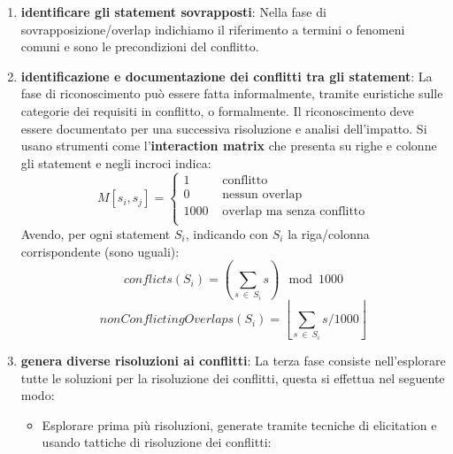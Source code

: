 \begin{enumerate}
      \item \textbf{identificare gli statement sovrapposti}:
            Nella fase di sovrapposizione/overlap indichiamo il riferimento a
            termini o fenomeni comuni e sono le precondizioni del conflitto.
      \item \textbf{identificazione e documentazione dei conflitti tra gli statement}:
            La fase di riconoscimento può essere fatta informalmente, tramite
            euristiche sulle categorie dei requisiti in conflitto, o formalmente.
            Il riconoscimento deve essere documentato per una successiva risoluzione
            e analisi dell'impatto. Si usano strumenti come l'\textbf{interaction
                  matrix} che presenta su righe e colonne gli statement e
            negli incroci indica:
            \begin{equation}
                  M[s_i,s_j] = \begin{cases}
                        1    & \text{ conflitto}                  \\
                        0    & \text{ nessun overlap}             \\
                        1000 & \text{ overlap ma senza conflitto} \\
                  \end{cases}
            \end{equation}
            Avendo, per ogni statement $S_i$, indicando con $S_i$ la riga/colonna
            corrispondente (sono uguali):
            \begin{equation}
                  conflicts(S_i) = \left(\sum_{s \ \in \ S_i} s \right) \mod 1000
            \end{equation}
            \begin{equation}
                  nonConflictingOverlaps(S_i) = \left\lfloor \sum_{s \ \in \
                        S_i} s / 1000 \right\rfloor
            \end{equation}
      \item \textbf{genera diverse risoluzioni ai conflitti}:
            La terza fase consiste nell'esplorare tutte le soluzioni per la risoluzione
            dei conflitti, questa si effettua nel seguente modo:
            \begin{itemize}
                  \item Esplorare prima più risoluzioni, generate tramite tecniche
                        di elicitation e usando tattiche di risoluzione dei conflitti:

\end{itemize}
\end{enumerate}
